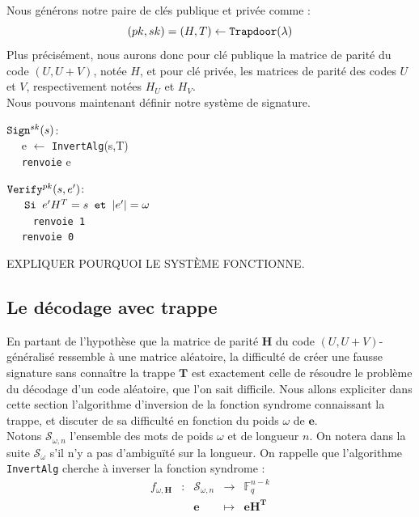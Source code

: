 \documentclass[12pt]{article}
\theoremstyle{plain}
\newcommand{\F}{\mathbb{F}}
\newcommand{\e}{\mathbf{e}}
\begin{document}
\noindent Nous générons notre paire de clés publique et privée comme :
$$ (pk, sk) = (H,T) \leftarrow \verb|Trapdoor|(\lambda)$$
Plus précisément, nous aurons donc pour clé publique la matrice de parité du code $(U,U+V)$, notée $H$, et pour clé privée, les matrices de parité des codes $U$ et $V$, respectivement notées $H_U$ et $H_V$.\\
Nous pouvons maintenant définir notre système de signature.
\begin{multicols}{2}
\begin{flushleft}
$\verb|Sign|^{sk}(s)$:\\
	$\quad$ e $\leftarrow$  \verb|InvertAlg|(s,T) \\
	$\quad$ \verb|renvoie| e
\end{flushleft}
\begin{flushleft}
$\verb|Verify|^{pk}(s,e')$: \\
	$\quad \verb| Si | e'H^T = s \verb| et | |e'| = \omega $ \\
	$\quad \quad$ \verb|renvoie 1| \\
	$\quad$ \verb|renvoie 0|
\end{flushleft}
\end{multicols}

EXPLIQUER POURQUOI LE SYSTÈME FONCTIONNE.

\subsection{Le décodage avec trappe}

En partant de l'hypothèse que la matrice de parité $\mathbf{H}$ du code $(U,U+V)$-généralisé ressemble à une matrice aléatoire, la difficulté de créer une fausse signature sans connaître la trappe $\mathbf{T}$ est exactement celle de résoudre le problème du décodage d'un code aléatoire, que l'on sait difficile. Nous allons expliciter dans cette section l'algorithme d'inversion de la fonction syndrome connaissant la trappe, et discuter de sa difficulté en fonction du poids $\omega$ de $\e$. \\

\noindent Notons $\mathcal{S}_{\omega,n}$ l'ensemble des mots de poids $\omega$ et de longueur $n$. On notera dans la suite $\mathcal{S}_{\omega}$ s'il n'y a pas d’ambiguïté sur la longueur. On rappelle que l'algorithme \verb|InvertAlg| cherche à inverser la fonction syndrome : 
$$\begin{array}{ccccc}
f_{\omega,\mathbf{H}} & : & \mathcal{S}_{\omega,n} & \to & \F_q^{n-k} \\
 & & \mathbf{e} & \mapsto & \mathbf{eH^T} \\
\end{array}$$
\end{document}
